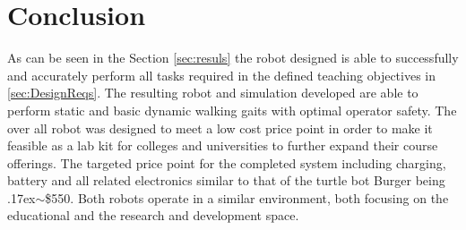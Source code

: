 \documentclass[conference]{IEEEtran}
\newcommand{\approximately}{{\raise.17ex\hbox{$\scriptstyle\mathtt{\sim}$}}}
\begin{document}
\section{Conclusion}
As can be seen in the Section \ref{sec:resuls} the robot designed is able to successfully and accurately perform all tasks required in the defined teaching objectives in \ref{sec:DesignReqs}. The resulting robot and simulation developed are able to perform static and basic dynamic walking gaits with optimal operator safety. The over all robot was designed to meet a low cost price point in order to make it feasible as a lab kit for colleges and universities to further expand their course offerings. The targeted price point for the completed system including charging, battery and all related electronics similar to that of the turtle bot Burger being \approximately\$550. Both robots operate in a similar environment, both focusing on the educational and the research and development space.  
\end{document}
